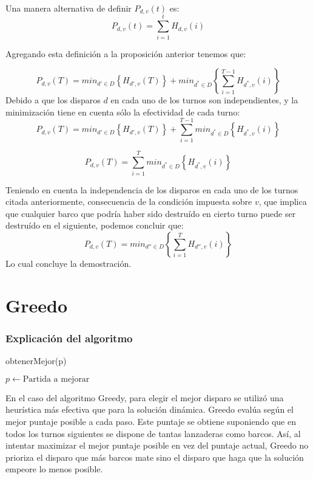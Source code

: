 \documentclass{article}
\begin{document}
Una manera alternativa de definir $P_{d,v}(t)$ es:$$P_{d,v}(t)=\sum_{i=1}^{t} H_{d,v}(i)$$

Agregando esta definición a la proposición anterior tenemos que:

$$P_{d,v}(T)=min_{d' \in D} \left \{ H_{d',v}(T) \right \}+min_{d^* \in D}\left \{ \sum_{i=1}^{T-1} H_{d^*,v}(i) \right \}$$
Debido a que los disparos $d$ en cada uno de los turnos son independientes, y la minimización tiene en cuenta sólo la efectividad de cada turno:
$$P_{d,v}(T)=min_{d' \in D} \left \{ H_{d',v}(T) \right \}+\sum_{i=1}^{T-1} min_{d^* \in D}\left \{  H_{d^*,v}(i) \right \}$$

$$P_{d,v}(T)=\sum_{i=1}^{T} min_{d^* \in D}\left \{  H_{d^*,v}(i) \right \}$$

Teniendo en cuenta la independencia de los disparos en cada uno de los turnos citada anteriormente, consecuencia de la condición impuesta sobre $v$, que implica que cualquier barco que podría haber sido destruído en cierto turno puede ser destruído en el siguiente, podemos concluir que:
$$P_{d,v}(T)=min_{d'' \in D}\left \{ \sum_{i=1}^{T} H_{d'',v}(i) \right \}$$
Lo cual concluye la demostración.

\part{Greedo}

\section{Explicación del algoritmo}

\begin{algorithm}
\caption{obtenerMejor(p)}
    $p \leftarrow \text{Partida a mejorar}$ \\
\end{algorithm}

En el caso del algoritmo Greedy, para elegir el mejor disparo se utilizó una heurística más efectiva que para la solución dinámica. Greedo evalúa según el mejor puntaje posible a cada paso. Este puntaje se obtiene suponiendo que en todos los turnos siguientes se dispone de tantas lanzaderas como barcos. Así, al intentar maximizar el mejor puntaje posible en vez del puntaje actual, Greedo no prioriza el disparo que más barcos mate sino el disparo que haga que la solución empeore lo menos posible.
\end{document}
